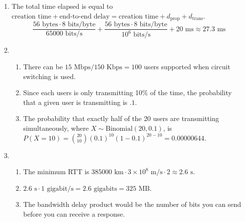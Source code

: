 \documentclass{article}
\begin{document}
\begin{enumerate}
        \item The total time elapsed is equal to
         $\text{creation time} + \text{end-to-end delay} = 
         \text{creation time} + d_\text{prop} + d_\text{trans}$. 
        \[
            \frac{56 \text{ bytes} \cdot 8 \text{ bits/byte}}{65000 \text{ bits/s}}+
            \frac{56 \text{ bytes} \cdot 8 \text{ bits/byte}}{10^6 \text{ bits/s}} + 20 \text{ ms} \approx \boxed{27.3 \text{ ms}}
        \]
        
        \item
        \begin{enumerate}
            \item There can be $15 \text{ Mbps} / 150 \text{ Kbps} = \boxed{100}$ users 
            supported when circuit switching is used.
            \item Since each users is only transmitting 10\% of the time, the 
            probability that a given user is transmitting is $\boxed{.1}$.
            \item The probability that exactly half of the 20 users are transmitting simultaneously,
            where $X \sim \text{Binomial}(20, 0.1)$, is $P(X=10) = \binom{20}{10} (0.1)^{10}(1-0.1)^{20-10} = \boxed{0.00000644}$.
        \end{enumerate}

        \item
        \begin{enumerate}
            \item The minimum RTT is $385000 \text{ km} \cdot 3\times 10^8 \text{ m/s}\cdot2 \approx \boxed{2.6 \text{ s}}$.
            \item $2.6 \text{ s} \cdot 1 \text{ gigabit/s} = 2.6 \text{ gigabits} = \boxed{325 \text{ MB}}$.
            \item The bandwidth delay product would be the number of bits you can send
            before you can receive a response.
        \end{enumerate}


\end{enumerate}
\end{document}
